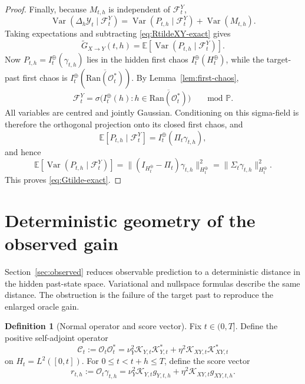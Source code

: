 \documentclass[11pt,a4paper]{amsart}
\theoremstyle{plain}
\theoremstyle{definition}
\newtheorem{definition}[theorem]{Definition}
\theoremstyle{remark}
\DeclareMathOperator{\Var}{Var}
\newcommand{\PP}{\mathbb{P}}
\newcommand{\EE}{\mathbb{E}}
\begin{document}
\begin{proof}
Finally, because $M_{t,h}$ is independent of $\mathcal F_t^Y$,
\[
\Var(\Delta_h\mathcal Y_t\mid \mathcal F_t^Y)
=
\Var(P_{t,h}\mid \mathcal F_t^Y)+\Var(M_{t,h}).
\]
Taking expectations and subtracting \eqref{eq:RtildeXY-exact} gives
\[
\widetilde G_{X\to Y}(t,h)
=
\EE\!\left[\Var(P_{t,h}\mid \mathcal F_t^Y)\right].
\]
Now $P_{t,h}=I_t^\oplus(\gamma_{t,h})$ lies in the hidden first chaos $I_t^\oplus(H_t^\oplus)$,
while the target-past first chaos is $I_t^\oplus(\overline{\mathrm{Ran}(\mathcal O_t^*)})$.
By Lemma~\ref{lem:first-chaos},
\[
\mathcal F_t^Y
=
\sigma\bigl(I_t^\oplus(h):h\in \overline{\mathrm{Ran}(\mathcal O_t^*)}\bigr)
\qquad\text{mod }\PP.
\]
All variables are centred and jointly Gaussian.  Conditioning on this sigma-field is therefore the
orthogonal projection onto its closed first chaos, and
\[
\EE[P_{t,h}\mid \mathcal F_t^Y]
=
I_t^\oplus(\Pi_t\gamma_{t,h}),
\]
and hence
\[
\EE\!\left[\Var(P_{t,h}\mid \mathcal F_t^Y)\right]
=
\| (I_{H_t^\oplus}-\Pi_t)\gamma_{t,h}\|_{H_t^\oplus}^2
=
\|\Sigma_t\gamma_{t,h}\|_{H_t^\oplus}^2.
\]
This proves \eqref{eq:Gtilde-exact}.
\end{proof}

\section{Deterministic geometry of the observed gain}\label{sec:geometry}

Section~\ref{sec:observed} reduces observable prediction to a deterministic distance in the
hidden past-state space.  Variational and nullspace formulas describe the same distance.  The
obstruction is the failure of the target past to reproduce the enlarged oracle gain.

\begin{definition}[Normal operator and score vector]\label{def:normal}
Fix $t\in(0,T]$. Define the positive self-adjoint operator
\begin{equation}\label{eq:Ct}
\mathcal C_t:=\mathcal O_t\mathcal O_t^*
=
\nu_Y^2\mathcal K_{Y,t}\mathcal K_{Y,t}^*
+ \eta^2\mathcal K_{XY,t}\mathcal K_{XY,t}^*
\end{equation}
on $H_t=L^2([0,t])$. For $0\le t<t+h\le T$, define the score vector
\begin{equation}\label{eq:rt}
r_{t,h}:=\mathcal O_t\gamma_{t,h}
=
\nu_Y^2\mathcal K_{Y,t}g_{Y,t,h}
+ \eta^2\mathcal K_{XY,t}g_{XY,t,h}.
\end{equation}
\end{definition}
\end{document}
